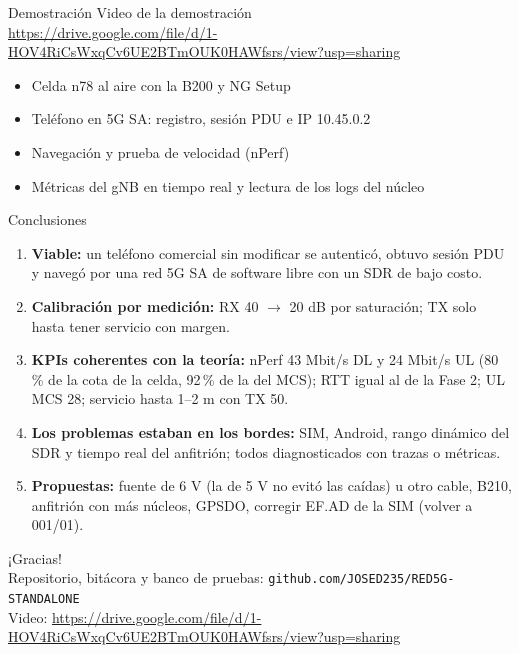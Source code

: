 \documentclass[aspectratio=169,10pt]{beamer}
\newcommand{\enlacevideo}{{\footnotesize\url{https://drive.google.com/file/d/1-HOV4RiCsWxqCv6UE2BTmOUK0HAWfsrs/view?usp=sharing}}}
\begin{document}
\begin{frame}{Demostración}
\centering
\Large Video de la demostración\\[0.6em]
\normalsize \enlacevideo\\[1.2em]
\begin{itemize}
  \item Celda n78 al aire con la B200 y NG Setup
  \item Teléfono en 5G SA: registro, sesión PDU e IP 10.45.0.2
  \item Navegación y prueba de velocidad (nPerf)
  \item Métricas del gNB en tiempo real y lectura de los logs del núcleo
\end{itemize}
\end{frame}

\begin{frame}{Conclusiones}
\begin{enumerate}\small
  \item \textbf{Viable:} un teléfono comercial sin modificar se autenticó, obtuvo sesión PDU y navegó por una red 5G SA de software libre con un SDR de bajo costo.
  \item \textbf{Calibración por medición:} RX 40 $\rightarrow$ 20 dB por saturación; TX solo hasta tener servicio con margen.
  \item \textbf{KPIs coherentes con la teoría:} nPerf 43 Mbit/s DL y 24 Mbit/s UL (80\,\% de la cota de la celda, 92\,\% de la del MCS); RTT igual al de la Fase 2; UL MCS 28; servicio hasta 1--2 m con TX 50.
  \item \textbf{Los problemas estaban en los bordes:} SIM, Android, rango dinámico del SDR y tiempo real del anfitrión; todos diagnosticados con trazas o métricas.
  \item \textbf{Propuestas:} fuente de 6 V (la de 5 V no evitó las caídas) u otro cable, B210, anfitrión con más núcleos, GPSDO, corregir EF.AD de la SIM (volver a 001/01).
\end{enumerate}
\end{frame}

\begin{frame}
\centering
\Large ¡Gracias!\\[1em]
\normalsize Repositorio, bitácora y banco de pruebas: \texttt{github.com/JOSED235/RED5G-STANDALONE}\\[0.5em]
Video: \enlacevideo
\end{frame}
\end{document}
